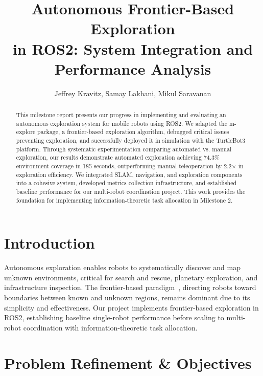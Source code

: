 \documentclass[conference]{IEEEtran}
\begin{document}
\title{Autonomous Frontier-Based Exploration\\ in ROS2: System Integration and Performance Analysis}

\author{Jeffrey Kravitz, Samay Lakhani, Mikul Saravanan}

\maketitle

\begin{abstract}
This milestone report presents our progress in implementing and evaluating an autonomous exploration system for mobile robots using ROS2. We adapted the m-explore package, a frontier-based exploration algorithm, debugged critical issues preventing exploration, and successfully deployed it in simulation with the TurtleBot3 platform. Through systematic experimentation comparing automated vs. manual exploration, our results demonstrate automated exploration achieving 74.3\% environment coverage in 185 seconds, outperforming manual teleoperation by 2.2$\times$ in exploration efficiency. We integrated SLAM, navigation, and exploration components into a cohesive system, developed metrics collection infrastructure, and established baseline performance for our multi-robot coordination project. This work provides the foundation for implementing information-theoretic task allocation in Milestone 2.
\end{abstract}

\IEEEpeerreviewmaketitle

\section{Introduction}

Autonomous exploration enables robots to systematically discover and map unknown environments, critical for search and rescue, planetary exploration, and infrastructure inspection. The frontier-based paradigm~\cite{yamauchi1997frontier}, directing robots toward boundaries between known and unknown regions, remains dominant due to its simplicity and effectiveness. Our project implements frontier-based exploration in ROS2, establishing baseline single-robot performance before scaling to multi-robot coordination with information-theoretic task allocation.

\section{Problem Refinement \& Objectives}
\end{document}
